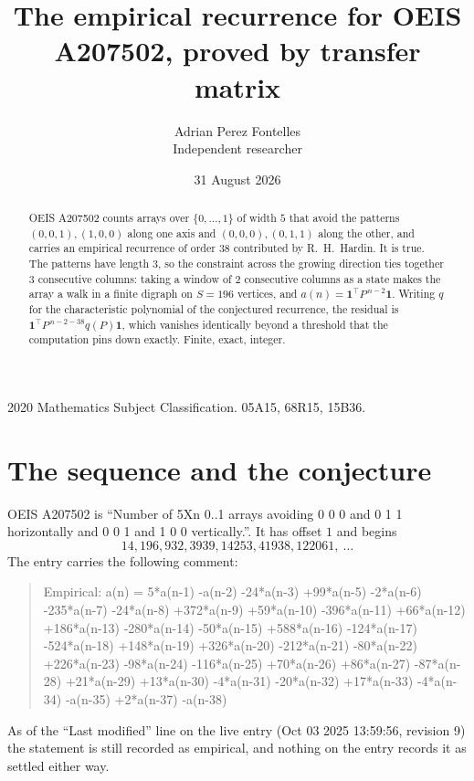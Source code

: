 \documentclass[11pt,a4paper]{article}
\title{The empirical recurrence for OEIS A207502, proved by transfer matrix}
\author{Adrian Perez Fontelles\\ \small Independent researcher}
\date{31 August 2026}
\theoremstyle{plain}
\theoremstyle{definition}
\begin{document}
\maketitle

\begin{abstract}
OEIS A207502 counts arrays over $\{0,\dots,1\}$ of width $5$ that avoid the patterns
$(0,0,1), (1,0,0)$ along one axis and $(0,0,0), (0,1,1)$ along the other, and carries an empirical recurrence of
order $38$ contributed by R.~H.~Hardin. It is true. The patterns have length $3$, so
the constraint across the growing direction ties together $3$ consecutive columns: taking a
window of $2$ consecutive columns as a state makes the array a walk in a finite digraph
on $S=196$ vertices, and $a(n)=\mathbf{1}^{\!\top}P^{\,n-2}\mathbf{1}$. Writing $q$
for the characteristic polynomial of the conjectured recurrence, the residual is
$\mathbf{1}^{\!\top}P^{\,n-2-38}q(P)\mathbf{1}$, which vanishes identically
beyond a threshold that the computation pins down exactly. Finite, exact, integer.
\end{abstract}

\noindent\small 2020 Mathematics Subject Classification. 05A15, 68R15, 15B36.\normalsize

\section{The sequence and the conjecture}

OEIS A207502 is ``Number of 5Xn 0..1 arrays avoiding 0 0 0 and 0 1 1 horizontally and 0 0 1 and 1 0 0 vertically.''. It has offset
$1$ and begins
\[
14, 196, 932, 3939, 14253, 41938, 122061,\ \dots
\]
The entry carries the following comment:
\begin{quote}\small
Empirical: a(n) = 5*a(n-1) -a(n-2) -24*a(n-3) +99*a(n-5) -2*a(n-6) -235*a(n-7) -24*a(n-8) +372*a(n-9) +59*a(n-10) -396*a(n-11) +66*a(n-12) +186*a(n-13) -280*a(n-14) -50*a(n-15) +588*a(n-16) -124*a(n-17) -524*a(n-18) +148*a(n-19) +326*a(n-20) -212*a(n-21) -80*a(n-22) +226*a(n-23) -98*a(n-24) -116*a(n-25) +70*a(n-26) +86*a(n-27) -87*a(n-28) +21*a(n-29) +13*a(n-30) -4*a(n-31) -20*a(n-32) +17*a(n-33) -4*a(n-34) -a(n-35) +2*a(n-37) -a(n-38)
\end{quote}
As of the ``Last modified'' line on the live entry (Oct 03 2025 13:59:56, revision
9) the statement is still recorded as empirical, and nothing on the entry
records it as settled either way.
\end{document}
